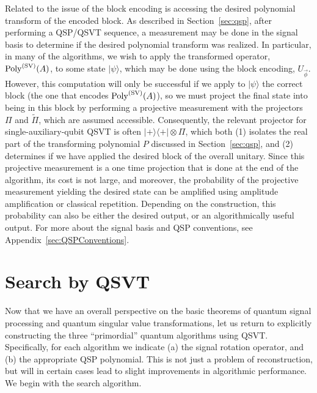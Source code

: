 \documentclass[aps,pra,showpacs,notitlepage,twocolumn,superscriptaddress,nofootinbib]{revtex4-1}
\begin{document}
Related to the issue of the block encoding is accessing the desired polynomial transform of the encoded block.  As described in Section~\ref{sec:qsp}, after performing a QSP/QSVT sequence, a measurement may be done in the signal basis to determine if the desired polynomial transform was realized.  In particular, in many of the algorithms, we wish to apply the transformed operator, ${\rm Poly}^{({\rm SV})}(A)$, to some state $|\psi\rangle$, which may be done using the block encoding, $U_{\vec{\phi}}$. However, this computation will only be successful if we apply to $|\psi\rangle$ the correct block (the one that encodes ${\rm Poly}^{({\rm SV})}(A)$), so we must project the final state into being in this block by performing a projective measurement with the projectors $\Pi$ and $\tilde{\Pi}$, which are assumed accessible. Consequently, the relevant projector for single-auxiliary-qubit QSVT is often $|+\rangle \langle + \rvert \otimes \Pi$, which both (1) isolates the real part of the transforming polynomial $P$ discussed in Section~\ref{sec:qsp}, and (2) determines if we have applied the desired block of the overall unitary. Since this projective measurement is a one time projection that is done at the end of the algorithm, its cost is not large, and moreover, the probability of the projective measurement yielding the desired state can be amplified using amplitude amplification or classical repetition.  Depending on the construction, this probability can also be either the desired output, or an algorithmically useful output.  For more about the signal basis and QSP conventions, see Appendix~\ref{sec:QSPConventions}.






\section{Search by QSVT} \label{sec:Search}
    
    Now that we have an overall perspective on the basic theorems of quantum signal processing and quantum singular value transformations, let us return to explicitly constructing the three ``primordial'' quantum algorithms using QSVT. Specifically, for each algorithm we indicate (a) the signal rotation operator, and (b) the appropriate QSP polynomial. This is not just a problem of reconstruction, but will in certain cases lead to slight improvements in algorithmic performance. We begin with the search algorithm.
    
\end{document}
